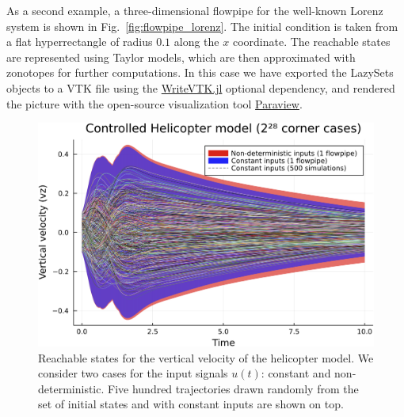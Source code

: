 As a second example, a three-dimensional flowpipe for the well-known Lorenz system is shown in Fig.~\ref{fig:flowpipe_lorenz}.
%
The initial condition is taken from a flat hyperrectangle of radius $0.1$ along the $x$ coordinate.
%
%
The reachable states are represented using Taylor models, which are then approximated with zonotopes for further computations.
%
In this case we have exported the LazySets objects to a VTK file using the \href{https://github.com/jipolanco/WriteVTK.jl}{WriteVTK.jl} optional dependency, and rendered the picture with the open-source visualization tool \href{https://www.paraview.org/}{Paraview}.


\begin{figure}[tb]
	\centering
	\includegraphics[width=\linewidth,keepaspectratio]{img/heli_08_simu}
	\vspace*{.5mm}
	\caption{Reachable states for the vertical velocity of the helicopter model.
	We consider two cases for the input signals $u(t)$: constant and non-deterministic. Five hundred trajectories drawn randomly from the set of initial states and with constant inputs are shown on top.}
	\label{fig:flowpipe_heli}
\end{figure}

